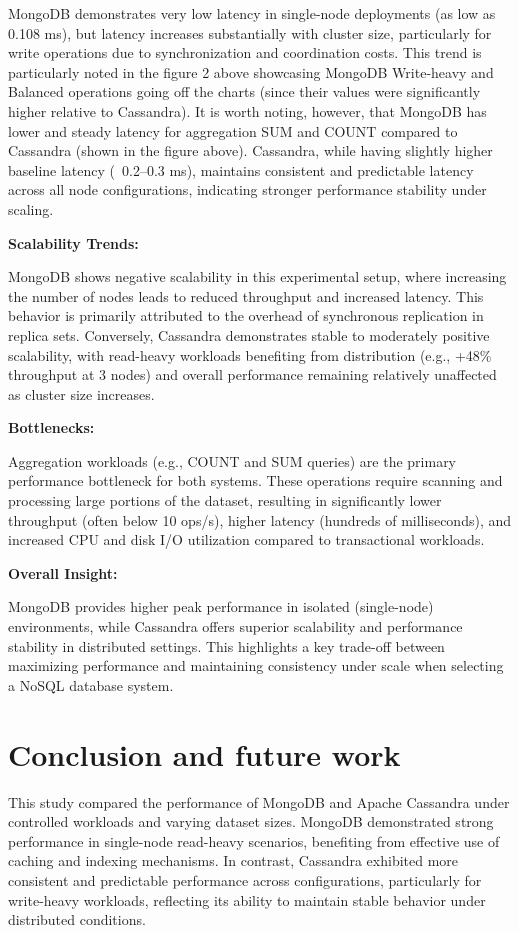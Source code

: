 \documentclass[12pt]{article}
\begin{document}
MongoDB demonstrates very low latency in single-node deployments (as low as 0.108 ms), but latency increases substantially with cluster size, particularly for write operations due to synchronization and coordination costs. This trend is particularly noted in the figure 2 above showcasing MongoDB Write-heavy and Balanced operations going off the charts (since their values were significantly higher relative to Cassandra). It is worth noting, however, that MongoDB has lower and steady latency for aggregation SUM and COUNT compared to Cassandra (shown in the figure above). Cassandra, while having slightly higher baseline latency (~0.2–0.3 ms), maintains consistent and predictable latency across all node configurations, indicating stronger performance stability under scaling.

\textbf{Scalability Trends:}

MongoDB shows negative scalability in this experimental setup, where increasing the number of nodes leads to reduced throughput and increased latency. This behavior is primarily attributed to the overhead of synchronous replication in replica sets. Conversely, Cassandra demonstrates stable to moderately positive scalability, with read-heavy workloads benefiting from distribution (e.g., +48\% throughput at 3 nodes) and overall performance remaining relatively unaffected as cluster size increases.

\textbf{Bottlenecks:}

Aggregation workloads (e.g., COUNT and SUM queries) are the primary performance bottleneck for both systems. These operations require scanning and processing large portions of the dataset, resulting in significantly lower throughput (often below 10 ops/s), higher latency (hundreds of milliseconds), and increased CPU and disk I/O utilization compared to transactional workloads.

\textbf{Overall Insight:}

MongoDB provides higher peak performance in isolated (single-node) environments, while Cassandra offers superior scalability and performance stability in distributed settings. This highlights a key trade-off between maximizing performance and maintaining consistency under scale when selecting a NoSQL database system.

\section{Conclusion and future work}

This study compared the performance of MongoDB and Apache Cassandra under controlled workloads and varying dataset sizes. MongoDB demonstrated strong performance in single-node read-heavy scenarios, benefiting from effective use of caching and indexing mechanisms. In contrast, Cassandra exhibited more consistent and predictable performance across configurations, particularly for write-heavy workloads, reflecting its ability to maintain stable behavior under distributed conditions.
\end{document}
